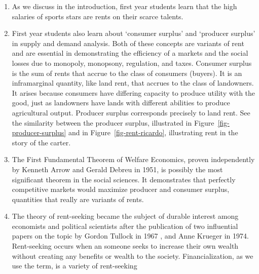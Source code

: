 \begin{enumerate}

\item As we discuss in the introduction, first year students learn that the high salaries of sports stars are rents on their scarce talents. 

 \item First year students also learn about `\gls{consumer surplus}' and `\gls{producer surplus}' in supply and demand analysis. Both of these concepts are variants of rent and are essential in demonstrating the efficiency of a markets and the social losses due to \gls{monopoly}, \gls{monopsony}, regulation, and taxes. Consumer surplus is the sum of rents that accrue to the class of consumers (buyers). It is an \gls{inframarginal} quantity, like land  rent, that accrues to the class of landowners. It arises because consumers have differing capacity to produce  utility with the good, just as landowners have lands with different abilities to produce agricultural output. Producer surplus corresponds precisely to land rent. See the similarity between the \gls{producer surplus}, illustrated in Figure~\ref{fig-producer-surplus} and in Figure~\ref{fig-rent-ricardo}, illustrating \gls{rent} in the story of the carter.

\item The First Fundamental Theorem of Welfare Economics, proven independently by Kenneth Arrow \cite{arrowExtensionBasicTheorems1951} and  Gerald Debreu \cite{debreuCoefficientResourceUtilization1951}  in 1951, is possibly the most significant theorem in the social sciences. It demonstrates that perfectly competitive markets would maximize producer and consumer surplus, quantities that really are variants of rents.

\item The theory of \gls{rent-seeking}  became the subject of durable interest among economists and political scientists after the publication of two influential papers on the topic by Gordon Tullock in 1967 \cite{tullockWelfareCostsTariffs1967}, and Anne Krueger \cite{kruegerPoliticalEconomyRentSeeking1974} in 1974. Rent-seeking occurs when an someone seeks to increase their own wealth without creating any benefits or wealth to the society. Financialization, as we use the term, is a variety of rent-seeking


\end{enumerate}
